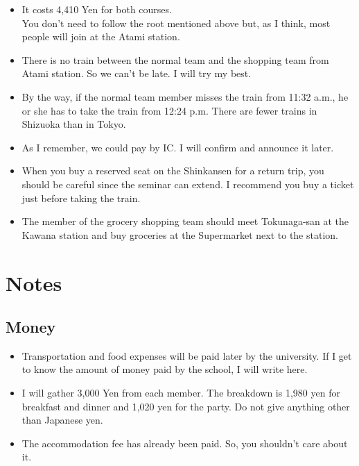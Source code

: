 \documentclass[unicode,a4paper,11pt]{ltjsarticle}
\begin{document}
\begin{itemize}
      \item
            It costs 4,410 Yen for both courses. \\
            You don't need to follow the root mentioned above but, as I think, most people will join at the Atami station.
      \item
            There is no train between the normal team and the shopping team from Atami station. So we can't be late. I will try my best.
      \item
            By the way, if the normal team member misses the train from 11:32 a.m., he or she has to take the train from 12:24 p.m. There are fewer trains in Shizuoka than in Tokyo.
      \item
            As I remember, we could pay by IC. I will confirm and announce it later.
      \item
            When you buy a reserved seat on the Shinkansen for a return trip, you should be careful since the seminar can extend. I recommend you buy a ticket just before taking the train.
      \item
            The member of the grocery shopping team should meet Tokunaga-san at the Kawana station and buy groceries at the Supermarket next to the station.
\end{itemize}


\section{Notes}


\subsection*{Money}

\begin{itemize}
      \item
            Transportation and food expenses will be paid later by the university. If I get to know the amount of money paid by the school, I will write here.
      \item
            I will gather 3,000 Yen from each member. The breakdown is 1,980 yen for breakfast and dinner and 1,020 yen for the party. Do not give anything other than Japanese yen.
      \item
            The accommodation fee has already been paid. So, you shouldn't care about it.
\end{itemize}
\end{document}
